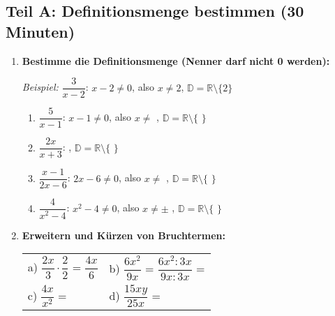\subsection*{Teil A: Definitionsmenge bestimmen (30 Minuten)}

\begin{enumerate}[label=\arabic*.]

    \item \textbf{Bestimme die Definitionsmenge (Nenner darf nicht 0 werden):}
    \vspace{0.5cm}

    \textit{Beispiel:} $\dfrac{3}{x-2}$: $x - 2 \neq 0$, also $x \neq 2$, $\mathbb{D} = \mathbb{R} \setminus \{2\}$

    \begin{enumerate}[label=\alph*)]
        \item $\dfrac{5}{x-1}$: $x - 1 \neq 0$, also $x \neq$ \underline{\hspace{1cm}}, $\mathbb{D} = \mathbb{R} \setminus \{$ \underline{\hspace{1cm}} $\}$
        \vspace{0.5cm}
        \item $\dfrac{2x}{x+3}$: \underline{\hspace{6cm}}, $\mathbb{D} = \mathbb{R} \setminus \{$ \underline{\hspace{1cm}} $\}$
        \vspace{0.5cm}
        \item $\dfrac{x-1}{2x-6}$: $2x - 6 \neq 0$, also $x \neq$ \underline{\hspace{1cm}}, $\mathbb{D} = \mathbb{R} \setminus \{$ \underline{\hspace{1cm}} $\}$
        \vspace{0.5cm}
        \item $\dfrac{4}{x^2-4}$: $x^2 - 4 \neq 0$, also $x \neq \pm$ \underline{\hspace{1cm}}, $\mathbb{D} = \mathbb{R} \setminus \{$ \underline{\hspace{2cm}} $\}$
    \end{enumerate}

    \vspace{1cm}

    \item \textbf{Erweitern und Kürzen von Bruchtermen:}
    \vspace{0.5cm}

    \begin{tabular}{ll}
        a) $\dfrac{2x}{3} \cdot \dfrac{2}{2}$ = $\dfrac{4x}{6}$ & b) $\dfrac{6x^2}{9x}$ = $\dfrac{6x^2 : 3x}{9x : 3x}$ = \underline{\hspace{2cm}} \\[4ex]
        c) $\dfrac{4x}{x^2}$ = \underline{\hspace{2cm}} & d) $\dfrac{15xy}{25x}$ = \underline{\hspace{2cm}}
    \end{tabular}


\end{enumerate}

